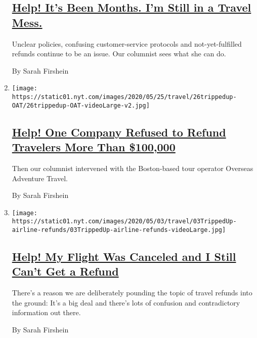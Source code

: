\begin{enumerate}
  \hypertarget{help-its-been-months-im-still-in-a-travel-mess}{%
  \subsection{\texorpdfstring{\href{/2020/06/18/travel/travel-refunds-airlines.html}{Help!
  It's Been Months. I'm Still in a Travel
  Mess.}}{Help! It's Been Months. I'm Still in a Travel Mess.}}\label{help-its-been-months-im-still-in-a-travel-mess}}

  Unclear policies, confusing customer-service protocols and
  not-yet-fulfilled refunds continue to be an issue. Our columnist sees
  what she can do.

  By Sarah Firshein
\item
  \texttt{[image: https://static01.nyt.com/images/2020/05/25/travel/26trippedup-OAT/26trippedup-OAT-videoLarge-v2.jpg]}

  \hypertarget{help-one-company-refused-to-refund-travelers-more-than-100000}{%
  \subsection{\texorpdfstring{\href{/2020/05/25/travel/coronavirus-refunds-overseas-adventure-travel.html}{Help!
  One Company Refused to Refund Travelers More Than
  \$100,000}}{Help! One Company Refused to Refund Travelers More Than \$100,000}}\label{help-one-company-refused-to-refund-travelers-more-than-100000}}

  Then our columnist intervened with the Boston-based tour operator
  Overseas Adventure Travel.

  By Sarah Firshein
\item
  \texttt{[image: https://static01.nyt.com/images/2020/05/03/travel/03TrippedUp-airline-refunds/03TrippedUp-airline-refunds-videoLarge.jpg]}

  \hypertarget{help-my-flight-was-canceled-and-i-still-cant-get-a-refund}{%
  \subsection{\texorpdfstring{\href{/2020/05/01/travel/trip-refund-airlines.html}{Help!
  My Flight Was Canceled and I Still Can't Get a
  Refund}}{Help! My Flight Was Canceled and I Still Can't Get a Refund}}\label{help-my-flight-was-canceled-and-i-still-cant-get-a-refund}}

  There's a reason we are deliberately pounding the topic of travel
  refunds into the ground: It's a big deal and there's lots of confusion
  and contradictory information out there.

  By Sarah Firshein
\end{enumerate}

